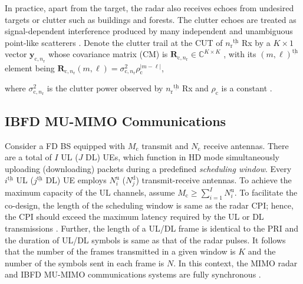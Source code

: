 \documentclass[10pt,journal]{IEEEtran}
\newcommand{\paren}[1]{\left({#1}\right)}
\newcommand{\bracket}[1]{{\left [{#1}\right ]}}
\newcommand{\braces}[1]{{\left\{ {#1}\right\}}}
\newcommand{\ith}[1]    {{#1}^{\underline{\text{th}}}}
\newcommand{\rr}{_\mathrm{r}}
\newcommand{\cc}{_\mathrm{c}}
\theoremstyle{definition}
\begin{document}
In practice, apart from the target, the radar also receives echoes from undesired targets or clutter such as buildings and forests. %
The clutter echoes are treated as signal-dependent interference produced by many independent and unambiguous point-like scatterers \cite{NaghshTSP2017}. Denote the clutter trail at the CUT of $\ith{n\rr}$ Rx by a $K \times 1$ vector $\mathbf{y}_{\mathrm{c},n\rr}$ whose covariance matrix (CM) is $\mathbf{R}_{\textrm{c},n\rr}\in\mathbb{C}^{\mathit{K}\times K}$%
, with its $\ith{\paren{m,\ell}}$ element being $\mathbf{R}_{\textrm{c},n\rr}\paren{m,\ell}=\sigma^2_{\textrm{c},n\rr}\rho_{\mathrm{c}}^{\lvert m-\ell\rvert}$,

where $\sigma^2_{\textrm{c},n\rr}$ is the clutter power observed by $\ith{n\rr}$ Rx and $\rho_{\textrm{c}}$ is a constant \cite{NaghshTSP2017}. 
\subsection{IBFD MU-MIMO Communications}
Consider a FD BS equipped with $\mathit{M}_\textrm{c}$ transmit and $\mathit{N}_{\textrm{c}}$ receive antennas. There are a total of $\mathit{I}$ UL ($\mathit{J}$ DL) UEs, which function in HD mode simultaneously uploading (downloading) packets during a predefined \textit{scheduling  window}. Every $\ith{i}$ UL ($\ith{j}$ DL) UE employs $\mathit{N}^{\textrm{u}}_i$ ($\mathit{N}^{\textrm{d}}_j$) transmit-receive antennas. %
To achieve the maximum capacity of the UL channels, assume $\mathit{M}\cc\geq\sum_{i=1}^{\mathit{I}}\mathit{N}^{\textrm{u}}_i$\cite{tse2005fundamentals}. To facilitate the co-design, the length of the scheduling window is same as the radar CPI; hence, the CPI should exceed the maximum latency required by the UL or DL transmissions \cite{ShiftMIMO}. Further, the length of a UL/DL frame is identical to the PRI and the duration of UL/DL symbols is same as that of the radar pulses. It follows that the number of the frames transmitted in a given window is $\mathit{K}$ and the number of the symbols sent in each frame is $\mathit{N}$. %
In this context, the MIMO radar and IBFD MU-MIMO communications systems are fully synchronous \cite{MCMIMO_RadComm}. 
\end{document}
